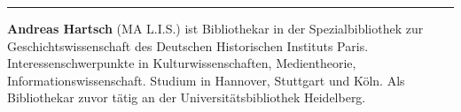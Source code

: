 \begin{center}\rule{0.5\linewidth}{\linethickness}\end{center}

\textbf{Andreas Hartsch} (MA L.I.S.) ist Bibliothekar in der
Spezialbibliothek zur Geschichtswissenschaft des Deutschen Historischen
Instituts Paris. Interessenschwerpunkte in Kulturwissenschaften,
Medientheorie, Informationswissenschaft. Studium in Hannover, Stuttgart
und Köln. Als Bibliothekar zuvor tätig an der Universitätsbibliothek
Heidelberg.
